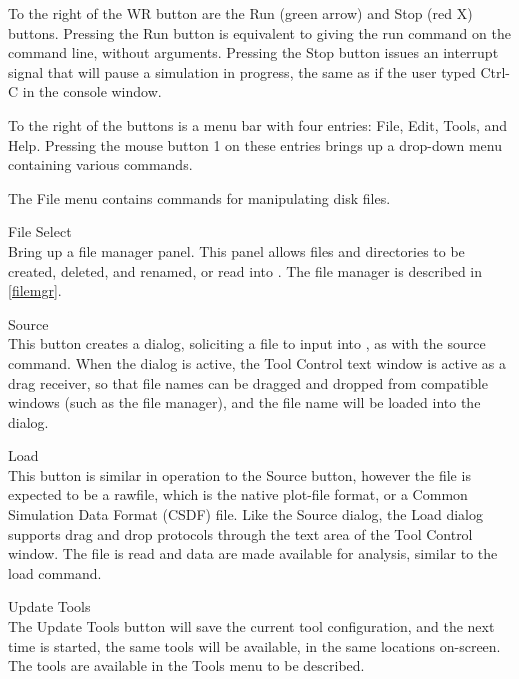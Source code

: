 To the right of the {\cb WR} button are the {\cb Run} (green arrow)
and {\cb Stop} (red X) buttons.  Pressing the {\cb Run} button is
equivalent to giving the {\cb run} command on the command line,
without arguments.  Pressing the {\cb Stop} button issues an interrupt
signal that will pause a simulation in progress, the same as if the
user typed {\kb Ctrl-C} in the console window.

To the right of the buttons is a menu bar with four entries:  {\cb
File}, {\cb Edit}, {\cb Tools}, and {\cb Help}.  Pressing the mouse
button 1 on these entries brings up a drop-down menu containing
various commands.

The {\cb File} menu contains commands for manipulating disk files.

\begin{description}
\item{\cb File Select}\\
Bring up a file manager panel.  This panel allows files and
directories to be created, deleted, and renamed, or read into
{\WRspice}.  The file manager is described in \ref{filemgr}.

\item{\cb Source}\\
This button creates a dialog, soliciting a file to input into
{\WRspice}, as with the {\cb source} command.  When the dialog is
active, the {\cb Tool Control} text window is active as a drag
receiver, so that file names can be dragged and dropped from
compatible windows (such as the file manager), and the file name will
be loaded into the dialog.

\item{\cb Load}\\
This button is similar in operation to the {\cb Source} button,
however the file is expected to be a rawfile, which is the native
plot-file format, or a Common Simulation Data Format (CSDF) file. 
Like the {\cb Source} dialog, the {\cb Load} dialog supports drag and
drop protocols through the text area of the {\cb Tool Control} window. 
The file is read and data are made available for analysis, similar to
the {\cb load} command.

\item{\cb Update Tools}\\
The {\cb Update Tools} button will save the current tool
configuration, and the next time {\WRspice} is started, the same tools
will be available, in the same locations on-screen.  The tools are
available in the {\cb Tools} menu to be described.


\end{description}
